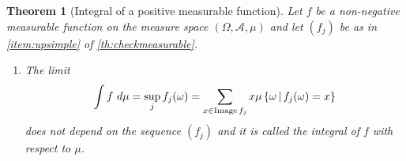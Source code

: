 \documentclass[12pt,a4paper]{amsart}
\theoremstyle{plain}
\newtheorem{theorem}{Theorem}%
\theoremstyle{definition}
\theoremstyle{remark}
\begin{document}
\begin{theorem}[Integral of a positive measurable function]
Let $f$ be a non-negative measurable function on the measure space
$(\Omega,\mathcal A,\mu)$ and let $(f_j)$ be as in
\cref{item:upsimple} of \cref{th:checkmeasurable}.
\begin{enumerate}
\item The limit
  \begin{equation*}
    \int f \ d\mu = \sup_j f_j(\omega) = \sum_{x \in
      \operatorname{Image} f_j} x \mu\left\{\omega \, \middle| \, f_j(\omega) = x \right\}  
  \end{equation*}
  does not depend on the sequence $(f_j)$ and it is called the
  \emph{integral of $f$ with respect to $\mu$}.
\end{enumerate}

\end{theorem}



\end{document}
